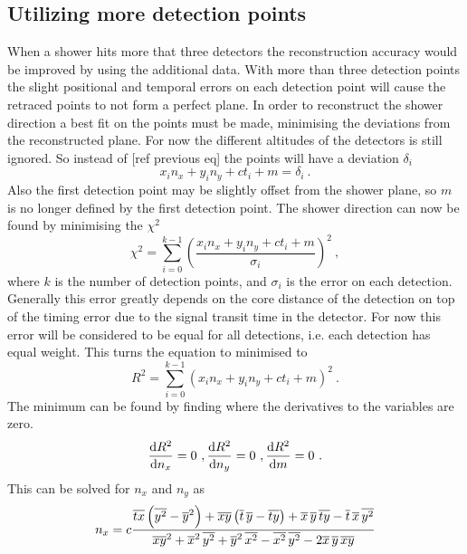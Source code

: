 \subsection{Utilizing more detection points}

When a shower hits more that three detectors the reconstruction accuracy would be improved by using the additional data. With more than three detection points the slight positional and temporal errors on each detection point will cause the retraced points to not form a perfect plane. In order to reconstruct the shower direction a best fit on the points must be made, minimising the deviations from the reconstructed plane. For now the different altitudes of the detectors is still ignored. So instead of [ref previous eq] the points will have a deviation $\delta_i$
%
\begin{equation}
    x_i n_x + y_i n_y + c t_i + m = \delta_i \ .
\end{equation}
%
Also the first detection point may be slightly offset from the shower plane, so $m$ is no longer defined by the first detection point. The shower direction can now be found by minimising the $\chi^2$
%
\begin{equation}
    \chi^2 = \sum_{i = 0}^{k - 1}
             \left(\frac{x_i n_x + y_i n_y + c t_i + m}
                        {\sigma_i} \right)^2 \ ,
\end{equation}
%
where $k$ is the number of detection points, and $\sigma_i$ is the error on each detection. Generally this error greatly depends on the core distance of the detection on top of the timing error due to the signal transit time in the detector. For now this error will be considered to be equal for all detections, i.e. each detection has equal weight. This turns the equation to minimised to
%
\begin{equation}
    R^2 = \sum_{i=0}^{k-1} \left(x_i n_x + y_i n_y + c t_i + m \right)^2 \ .
\end{equation}
%
The minimum can be found by finding where the derivatives to the variables are zero.
%
\begin{equation}
    \frac{\mathrm{d} R^2}{\mathrm{d} n_x} = 0 \ ,
    \frac{\mathrm{d} R^2}{\mathrm{d} n_y} = 0 \ ,
    \frac{\mathrm{d} R^2}{\mathrm{d} m} = 0 \ .
\end{equation}
%
This can be solved for $n_x$ and $n_y$ as
%
\begin{equation}
n_x = c \frac{\overline{t x} \left( \overline{y^2} - \overline{y}^2 \right) +
              \overline{x y} \left( \overline{t} \, \overline{y} - \overline{t y} \right) +
              \overline{x} \, \overline{y} \, \overline{t y} -
              \overline{t} \, \overline{x} \, \overline{y^2}}
             {\overline{x y}^2 + \overline{x}^2 \, \overline{y^2} +
              \overline{y}^2 \, \overline{x^2} - \overline{x^2} \, \overline{y^2} -
              2 \overline{x} \, \overline{y} \, \overline{x y}}
\end{equation}
